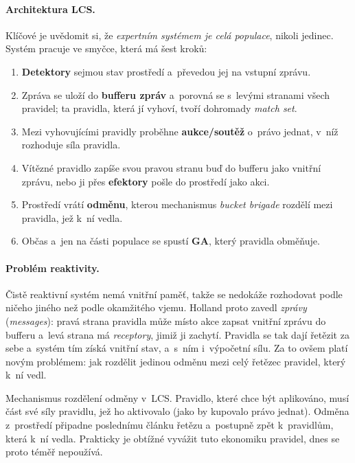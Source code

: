 \documentclass[11pt,a4paper]{article}
\theoremstyle{definition}
\begin{document}
\paragraph{Architektura LCS.} Klíčové je uvědomit si, že \emph{expertním
systémem je celá populace}, nikoli jedinec. Systém pracuje ve smyčce, která má šest kroků:
\begin{enumerate}
\item \textbf{Detektory} sejmou stav prostředí a~převedou jej na vstupní zprávu.
\item Zpráva se uloží do \textbf{bufferu zpráv} a~porovná se s~levými stranami
  všech pravidel; ta pravidla, která jí vyhoví, tvoří dohromady \emph{match set}.
\item Mezi vyhovujícími pravidly proběhne \textbf{aukce/soutěž} o~právo jednat,
  v~níž rozhoduje síla pravidla.
\item Vítězné pravidlo zapíše svou pravou stranu buď do bufferu jako vnitřní
  zprávu, nebo ji přes \textbf{efektory} pošle do prostředí jako akci.
\item Prostředí vrátí \textbf{odměnu}, kterou mechanismus \emph{bucket brigade}
  rozdělí mezi pravidla, jež k~ní vedla.
\item Občas a~jen na části populace se spustí \textbf{GA}, který pravidla obměňuje.
\end{enumerate}

\paragraph{Problém reaktivity.} Čistě reaktivní systém nemá vnitřní paměť,
takže se nedokáže rozhodovat podle ničeho jiného než podle okamžitého vjemu.
Holland proto zavedl \emph{zprávy} (\emph{messages}): pravá strana pravidla
může místo akce zapsat vnitřní zprávu do bufferu a~levá strana má
\emph{receptory}, jimiž ji zachytí. Pravidla se tak dají řetězit za sebe
a~systém tím získá vnitřní stav, a~s~ním i~výpočetní sílu. Za to ovšem platí
novým problémem: jak rozdělit jedinou odměnu mezi celý řetězec pravidel, který
k~ní vedl.

\begin{defbox}
Mechanismus rozdělení odměny v~LCS. Pravidlo, které chce být aplikováno,
musí  část své síly pravidlu, jež ho aktivovalo (jako by kupovalo
právo jednat). Odměna z~prostředí připadne poslednímu článku řetězu a~postupně
 zpět k~pravidlům, která k~ní vedla. Prakticky je obtížné
vyvážit tuto ekonomiku pravidel, dnes se proto téměř nepoužívá.
\end{defbox}
\end{document}
